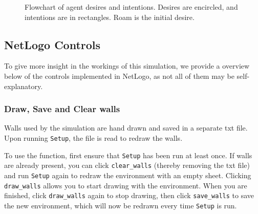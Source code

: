 \documentclass[a4paper]{article}
\begin{document}
\begin{figure}[!ht]
  \centering

\captionsetup{justification=centering,margin=1cm}
\caption{Flowchart of agent desires and intentions. Desires are encircled, and intentions are in rectangles. Roam is the initial desire.}
\label{tikz:flow}
\end{figure}


\subsection{NetLogo Controls}
To give more insight in the workings of this simulation, we provide a overview below of the controls implemented in NetLogo, as not all of them may be self-explanatory.

\subsubsection{Draw, Save and Clear walls}
Walls used by the simulation are hand drawn and saved in a separate txt file. Upon running \texttt{Setup}, the file is read to redraw the walls.

To use the function, first ensure that \texttt{Setup} has been run at least once. If walls are already present, you can click \texttt{clear\_walls} (thereby removing the txt file) and run \texttt{Setup} again to redraw the environment with an empty sheet. Clicking \texttt{draw\_walls} allows you to start drawing with the environment. When you are finished, click \texttt{draw\_walls} again to stop drawing, then click \texttt{save\_walls} to save the new environment, which will now be redrawn every time \texttt{Setup} is run.
\end{document}
